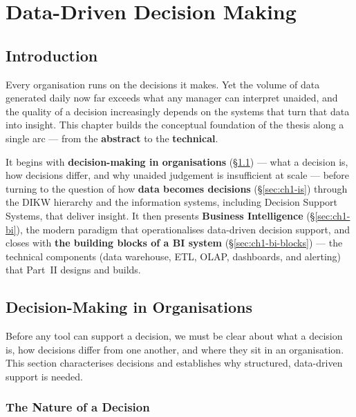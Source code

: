 \chapter{Data-Driven Decision Making}

\section*{Introduction}

Every organisation runs on the decisions it makes. Yet the volume of data generated daily now far
exceeds what any manager can interpret unaided, and the quality of a decision increasingly depends on
the systems that turn that data into insight. This chapter builds the conceptual foundation of the
thesis along a single arc --- from the \textbf{abstract} to the \textbf{technical}.

It begins with \textbf{decision-making in organisations} (\S\ref{sec:ch1-decisions}) --- what a decision
is, how decisions differ, and why unaided judgement is insufficient at scale --- before turning to the
question of how \textbf{data becomes decisions} (\S\ref{sec:ch1-is}) through the DIKW hierarchy and the
information systems, including Decision Support Systems, that deliver insight. It then presents
\textbf{Business Intelligence} (\S\ref{sec:ch1-bi}), the modern paradigm that operationalises
data-driven decision support, and closes with \textbf{the building blocks of a BI system}
(\S\ref{sec:ch1-bi-blocks}) --- the technical components (data warehouse, ETL, OLAP, dashboards, and
alerting) that Part~II designs and builds.

\section{Decision-Making in Organisations}
\label{sec:ch1-decisions}

Before any tool can support a decision, we must be clear about what a decision is, how decisions
differ from one another, and where they sit in an organisation. This section characterises decisions
and establishes why structured, data-driven support is needed.

\subsection{The Nature of a Decision}

